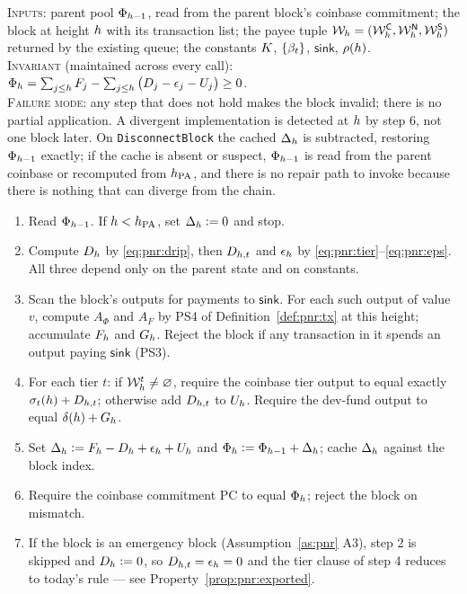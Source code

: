 \begin{construction}
\label{con:pnr:connect}
\textsc{Inputs}: parent pool $\Phi_{h-1}$, read from the parent block's coinbase commitment; the
block at height $h$ with its transaction list; the \PoN payee tuple
$\mathcal{W}_{h} = (\mathcal{W}_{h}^{\mathsf{C}}, \mathcal{W}_{h}^{\mathsf{N}}, \mathcal{W}_{h}^{\mathsf{S}})$ returned by the
existing queue; the constants $K$, $\{\beta_{t}\}$, $\mathsf{sink}$, $\rho(h)$.\\
\textsc{Invariant} (maintained across every call):
$\Phi_{h} = \sum_{j \le h} F_j - \sum_{j \le h}\big(D_j - \epsilon_j - U_j\big) \ge 0$.\\
\textsc{Failure mode}: any step that does not hold makes the block invalid; there is no partial
application. A divergent implementation is detected at $h$ by step 6, not one block later. On
\texttt{Disconnect\allowbreak{}Block} the cached $\Delta_{h}$ is subtracted, restoring $\Phi_{h-1}$ exactly;
if the cache is absent or suspect, $\Phi_{h-1}$ is read from the parent coinbase or recomputed
from $h_{\mathrm{PA}}$, and there is no repair path to invoke because there is nothing that can diverge from
the chain.
\begin{enumerate}
  \item Read $\Phi_{h-1}$. If $h < h_{\mathrm{PA}}$, set $\Delta_{h} \vcentcolon= 0$ and stop.
  \item Compute $D_{h}$ by \eqref{eq:pnr:drip}, then $D_{h,t}$ and $\epsilon_{h}$ by
    \eqref{eq:pnr:tier}--\eqref{eq:pnr:eps}. All three depend only on the parent state and on
    constants.
  \item Scan the block's outputs for payments to $\mathsf{sink}$. For each such output of value $v$,
    compute $A_\Phi$ and $A_F$ by PS4 of Definition~\ref{def:pnr:tx} at this height; accumulate
    $F_{h}$ and $G_{h}$. Reject the block if any transaction in it spends an output paying
    $\mathsf{sink}$ (PS3).
  \item For each tier $t$: if $\mathcal{W}_{h}^{t} \ne \varnothing$, require the coinbase tier output
    to equal exactly $\sigma_t(h) + D_{h,t}$; otherwise add $D_{h,t}$ to $U_{h}$.
    Require the dev-fund output to equal $\delta(h) + G_{h}$.
  \item Set $\Delta_{h} \vcentcolon= F_{h} - D_{h} + \epsilon_{h} + U_{h}$ and
    $\Phi_{h} \vcentcolon= \Phi_{h-1} + \Delta_{h}$; cache $\Delta_{h}$ against the block index.
  \item Require the coinbase commitment PC to equal $\Phi_{h}$; reject the block on mismatch.
  \item If the block is an emergency block (Assumption~\ref{as:pnr} A3), step 2 is skipped and
    $D_{h} \vcentcolon= 0$, so $D_{h,t} = \epsilon_{h} = 0$ and the tier clause of step 4 reduces to
    today's rule --- see Property~\ref{prop:pnr:exported}.
\end{enumerate}
\end{construction}

